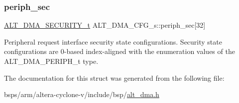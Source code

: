 \subsubsection{\texorpdfstring{periph\_sec}{periph\_sec}}
{\footnotesize\ttfamily \mbox{\hyperlink{group__ALT__DMA__COMMON_ga59d720d9a72123eca037cc48a734fd7c}{A\+L\+T\+\_\+\+D\+M\+A\+\_\+\+S\+E\+C\+U\+R\+I\+T\+Y\+\_\+t}} A\+L\+T\+\_\+\+D\+M\+A\+\_\+\+C\+F\+G\+\_\+s\+::periph\+\_\+sec\mbox{[}32\mbox{]}}

Peripheral request interface security state configurations. Security state configurations are 0-\/based index-\/aligned with the enumeration values of the A\+L\+T\+\_\+\+D\+M\+A\+\_\+\+P\+E\+R\+I\+P\+H\+\_\+t type. 

The documentation for this struct was generated from the following file\+:\begin{DoxyCompactItemize}
\item 
bsps/arm/altera-\/cyclone-\/v/include/bsp/\mbox{\hyperlink{alt__dma_8h}{alt\+\_\+dma.\+h}}\end{DoxyCompactItemize}
